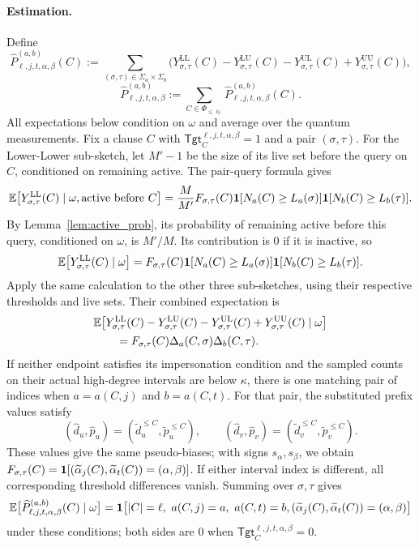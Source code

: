 \paragraph{Estimation.}
Define
\[
  \widehat P^{(a,b)}_{\ell,j,t,\alpha,\beta}(C):=
  \sum_{(\sigma,\tau)\in\Sigma_a\times\Sigma_b}
  \bigl(Y^{\mathrm{LL}}_{\sigma,\tau}(C)-Y^{\mathrm{LU}}_{\sigma,\tau}(C)
    -Y^{\mathrm{UL}}_{\sigma,\tau}(C)+Y^{\mathrm{UU}}_{\sigma,\tau}(C)\bigr),
\]
\[
  \widehat P^{(a,b)}_{\ell,j,t,\alpha,\beta}
  :=\sum_{C\in\Phi_{\le\ell_0}}\widehat P^{(a,b)}_{\ell,j,t,\alpha,\beta}(C).
\]
All expectations below condition on $\omega$ and average over the quantum measurements.
Fix a clause $C$ with $\mathsf{Tgt}^{\ell,j,t,\alpha,\beta}_C=1$ and a pair $(\sigma,\tau)$.
For the Lower-Lower sub-sketch, let $M'-1$ be the size of its live set before the query on $C$, conditioned on remaining active.
The pair-query formula gives
\[
\begin{aligned}
  \mathbb E\bigl[Y^{\mathrm{LL}}_{\sigma,\tau}(C)\mid\omega,\text{active before }C\bigr]
  =\frac M{M'}F_{\sigma,\tau}(C)
    \mathbf 1[N_a(C)\ge L_a(\sigma)]\mathbf 1[N_b(C)\ge L_b(\tau)].
\end{aligned}
\]
By Lemma~\ref{lem:active_prob}, its probability of remaining active before this query, conditioned on $\omega$, is $M'/M$.
Its contribution is $0$ if it is inactive, so
\[
  \mathbb E\bigl[Y^{\mathrm{LL}}_{\sigma,\tau}(C)\mid\omega\bigr]
  =F_{\sigma,\tau}(C)\mathbf 1[N_a(C)\ge L_a(\sigma)]\mathbf 1[N_b(C)\ge L_b(\tau)].
\]
Apply the same calculation to the other three sub-sketches, using their respective thresholds and live sets.
Their combined expectation is
\[
\begin{aligned}
  &\mathbb E\bigl[Y^{\mathrm{LL}}_{\sigma,\tau}(C)-Y^{\mathrm{LU}}_{\sigma,\tau}(C)
    -Y^{\mathrm{UL}}_{\sigma,\tau}(C)+Y^{\mathrm{UU}}_{\sigma,\tau}(C)\mid\omega\bigr]\\
  &\qquad=F_{\sigma,\tau}(C)\Delta_a(C,\sigma)\Delta_b(C,\tau).
\end{aligned}
\]
If neither endpoint satisfies its impersonation condition and the sampled counts on their actual high-degree intervals are below $\kappa$, there is one matching pair of indices when $a=a(C,j)$ and $b=a(C,t)$.
For that pair, the substituted prefix values satisfy
\[
  (\widehat d_u,\widehat p_u)=(\widetilde d_u^{\le C},\widetilde p_u^{\le C}),\qquad
  (\widehat d_v,\widehat p_v)=(\widetilde d_v^{\le C},\widetilde p_v^{\le C}).
\]
These values give the same pseudo-biases; with signs $s_\alpha,s_\beta$, we obtain $F_{\sigma,\tau}(C)=\mathbf 1[(\widetilde\alpha_j(C),\widetilde\alpha_t(C))=(\alpha,\beta)]$.
If either interval index is different, all corresponding threshold differences vanish.
Summing over $\sigma,\tau$ gives
\[
\begin{aligned}
  \mathbb E\bigl[\widehat P^{(a,b)}_{\ell,j,t,\alpha,\beta}(C)\mid\omega\bigr]
  =\mathbf 1\bigl[|C|=\ell,\ a(C,j)=a,\ a(C,t)=b,
    (\widetilde\alpha_j(C),\widetilde\alpha_t(C))=(\alpha,\beta)\bigr]
\end{aligned}
\]
under these conditions; both sides are $0$ when $\mathsf{Tgt}^{\ell,j,t,\alpha,\beta}_C=0$.

